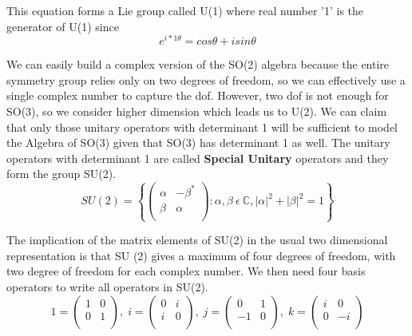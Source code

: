 This equation forms a Lie group called U(1) where real number '1' is the generator of U(1) since
\begin{equation}
    e^{i*1\theta} = cos\theta + i sin\theta
\end{equation}

We can easily build a complex version of the SO(2) algebra because the entire symmetry group relies only on two degrees of freedom, 
so we can effectively use a single complex number to capture the dof. 
However, two dof is not enough for SO(3), so we consider higher dimension which leads us to U(2).
We can claim that only those unitary operators with determinant 1 will be sufficient to model the Algebra of SO(3) given that SO(3) has determinant 1 as well.
The unitary operators with determinant 1 are called \textbf{Special Unitary} operators and they form the group SU(2).
\begin{equation}
    SU(2) = \left\{
        \begin{pmatrix}
        \alpha & -\beta^* \\ 
        \beta & \alpha \\ 
    \end{pmatrix}: 
    \alpha, \beta \: \epsilon \: \mathbb{C}, |\alpha|^2+|\beta|^2=1
    \right\}
\end{equation}

The implication of the matrix elements of SU(2) in the usual two dimensional representation is that SU (2)
gives a maximum of four degrees of freedom, with two degree of freedom for each complex number. We then
need four basis operators to write all operators in SU(2). 
\begin{equation}
    1 = \begin{pmatrix}
        1 & 0 \\ 
        0 & 1 \\ 
    \end{pmatrix}, \;
    i = \begin{pmatrix}
        0 & i \\ 
        i & 0 \\ 
    \end{pmatrix}, \; 
    j = \begin{pmatrix}
        0 & 1 \\ 
        -1 & 0 \\ 
    \end{pmatrix}, \;
    k = \begin{pmatrix}
        i & 0 \\ 
        0 & -i \\ 
    \end{pmatrix}
\end{equation}

